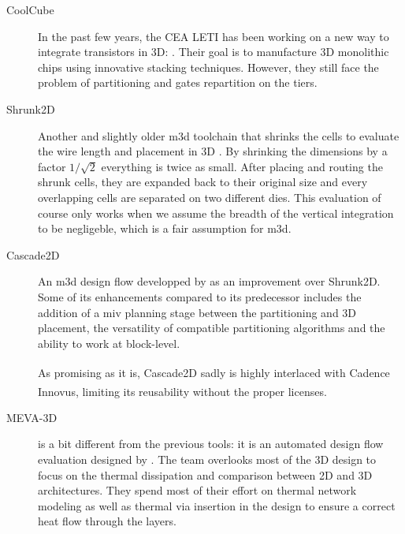 \documentclass[11pt,a4paper]{report} %
\theoremstyle{customdef}
\begin{document}
\begin{description}
	
	\item[CoolCube] In the past few years, the CEA LETI has been working on a new way to integrate transistors in 3D: \cite{Batude2015, Brunet2016, Clermidy2015, Michailos2016, Vinet2016}.
	Their goal is to manufacture 3D monolithic chips using innovative stacking techniques.
	However, they still face the problem of partitioning and gates repartition on the tiers.

	\item[Shrunk2D] Another and slightly older \gls{m3d} toolchain that shrinks the cells to evaluate the wire length and placement in 3D \citep{Panth}.
	By shrinking the dimensions by a factor $1/\sqrt2$ everything is twice as small.
	After placing and routing the shrunk cells, they are expanded back to their original size and every overlapping cells are separated on two different dies.
	This evaluation of course only works when we assume the breadth of the vertical integration to be negligeble, which is a fair assumption for \gls{m3d}.

	\item[Cascade2D] An \gls{m3d} design flow developped by \citet{Chang2016} as an improvement over Shrunk2D.
	Some of its enhancements compared to its predecessor includes the addition of a \gls{miv} planning stage between the partitioning and 3D placement, the versatility of compatible partitioning algorithms and the ability to work at block-level.

	As promising as it is, Cascade2D sadly is highly interlaced with Cadence\textsuperscript{\textregistered} Innovus\textsuperscript{\texttrademark}, limiting its reusability without the proper licenses.

	\item[MEVA-3D] is a bit different from the previous tools: it is an automated design flow evaluation designed by \citet{Cong2006}.
	The team overlooks most of the 3D design to focus on the thermal dissipation and comparison between 2D and 3D architectures.
	They spend most of their effort on thermal network modeling as well as thermal via insertion in the design to ensure a correct heat flow through the layers.
	
	
\end{description}
\end{document}
